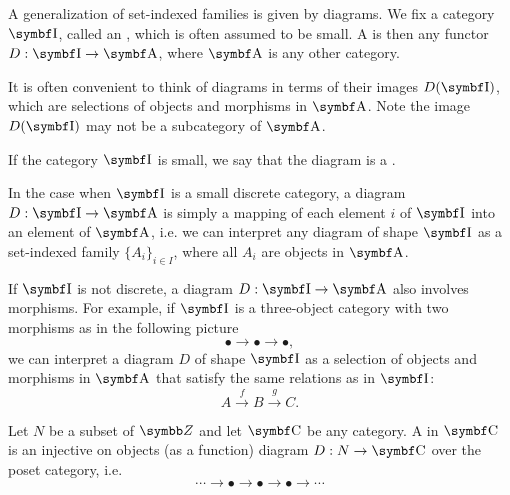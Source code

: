 \begin{definition}\label{def:categorical_diagram}
  A generalization of set-indexed families is given by diagrams. We fix a category \( \Bold I \), called an , which is often assumed to be small. A  is then any functor \( D: \Bold I \to \Cat{A} \), where \( \Cat{A} \) is any other category.

  It is often convenient to think of diagrams in terms of their images \( D(\Bold I) \), which are selections of objects and morphisms in \( \Cat{A} \). Note the image \( D(\Bold I) \) may not be a subcategory of \( \Cat{A} \).

  If the category \( \Bold I \) is small, we say that the diagram is a .
\end{definition}

\begin{example}\label{ex:categorical_diagrams}
  \mbox{}
  \begin{defenum}
    \item In the case when \( \Bold I \) is a small discrete category, a diagram \( D: \Bold I \to \Cat{A} \) is simply a mapping of each element \( i \) of \( \Bold I \) into an element of \( \Cat{A} \), i.e. we can interpret any diagram of shape \( \Bold I \) as a set-indexed family \( \{ A_i \}_{i \in I} \), where all \( A_i \) are objects in \( \Cat{A} \).

    \item If \( \Bold I \) is not discrete, a diagram \( D: \Bold I \to \Cat{A} \) also involves morphisms. For example, if \( \Bold I \) is a three-object category with two morphisms as in the following picture
    \begin{equation*}
      \bullet \longrightarrow \bullet \longrightarrow \bullet,
    \end{equation*}
    we can interpret a diagram \( D \) of shape \( \Bold I \) as a selection of objects and morphisms in \( \Cat{A} \) that satisfy the same relations as in \( \Bold I \):
    \begin{equation*}
      A
      \overset f \longrightarrow
      B
      \overset g \longrightarrow
      C.
    \end{equation*}
  \end{defenum}
\end{example}

\begin{definition}\label{def:tower_diagram}
  Let \( N \) be a subset of \( \Z \) and let \( \Cat{C} \) be any category. A  in \( \Bold{C} \) is an injective on objects (as a function) diagram \( D: N \to \Bold{C} \) over the poset category, i.e.
  \begin{equation}\label{def:tower_diagram/diagram}
    \cdots \longrightarrow \bullet \longrightarrow \bullet \longrightarrow \bullet \longrightarrow \cdots
  \end{equation}
\end{definition}

